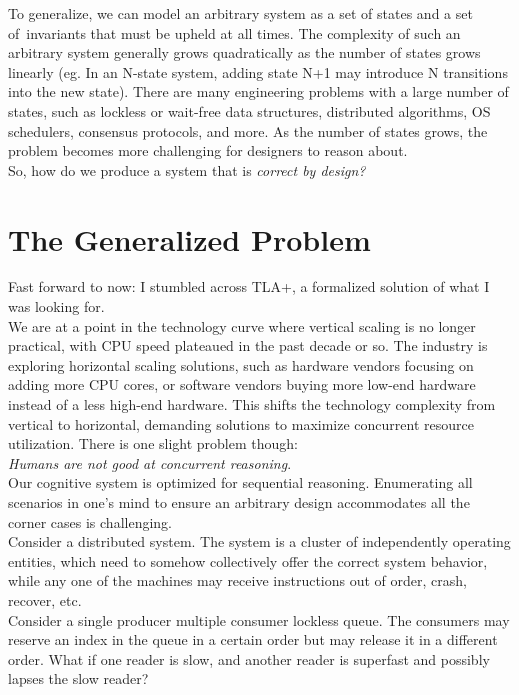 To generalize, we can model an arbitrary system as a set of states and a set of invariants that must be upheld at all times. The complexity of such an arbitrary system generally grows quadratically as the number of states grows linearly (eg.
In an N-state system, adding state N+1 may introduce N transitions into the new
state). There are many engineering problems with a large number of states, such
as lockless or wait-free data structures, distributed algorithms, OS schedulers,
consensus protocols, and more. As the number of states grows, the problem becomes
more challenging for designers to reason about.\\

So, how do we produce a system that is \textit{correct by design?} 

\section{The Generalized Problem}

Fast forward to now: I stumbled across TLA+, a formalized solution of what I
was looking for.\\

We are at a point in the technology curve where vertical scaling is no
longer practical, with CPU speed plateaued in the past decade or so. The industry
is exploring horizontal scaling solutions, such as hardware vendors focusing on
adding more CPU cores, or software vendors buying more low-end hardware instead
of a less high-end hardware. This shifts the technology complexity from vertical
to horizontal, demanding solutions to maximize concurrent resource
utilization. There is one slight problem though:\\

\textit{Humans are not good at concurrent reasoning}.\\

Our cognitive system is optimized for sequential reasoning. Enumerating
all scenarios in one's mind to ensure an arbitrary design accommodates all
the corner cases is challenging.\\

Consider a distributed system. The system is a cluster of independently operating
entities, which need to somehow collectively offer the correct system behavior,
while any one of the machines may receive instructions out of order, crash,
recover, etc.\\

Consider a single producer multiple consumer lockless queue. The consumers may
reserve an index in the queue in a certain order but may release it in a
different order. What if one reader is slow, and another reader is superfast
and possibly lapses the slow reader?\\

